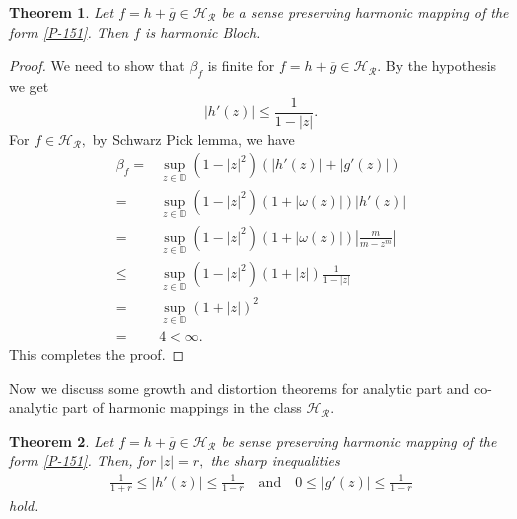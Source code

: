 \documentclass[a4paper,12pt]{amsart}
\newtheorem{thm}{Theorem}[section]
\theoremstyle{definition}
\begin{document}
	\begin{thm}
		Let $f=h+\overline{g}\in\mathcal{H_R}$ be a sense preserving harmonic mapping of the form \eqref{P-151}. Then $f$ is harmonic Bloch. 
	\end{thm}
	\begin{proof}
	We need to show that $\beta_f$ is finite for $f=h+\overline{g}\in\mathcal{H_R}$. By the hypothesis we get $$|h'(z)|\le\frac{1}{1-|z|}.$$ For $f\in\mathcal{H_R},$ by Schwarz Pick lemma, we have
	\begin{align*}
		\beta_f=& \sup_{z\in\mathbb{D}}(1-|z|^2)(|h'(z)|+|g'(z)|)\\
		= & \sup_{z\in\mathbb{D}}(1-|z|^2)(1+|\omega(z)|)|h'(z)|\\
		= & \sup_{z\in\mathbb{D}}(1-|z|^2)(1+|\omega(z)|)\left|\frac{m}{m-z^m}\right|\\
		\le & \sup_{z\in\mathbb{D}}(1-|z|^2)(1+|z|)\frac{1}{1-|z|}\\
		= & \sup_{z\in\mathbb{D}}(1+|z|)^2\\
		=& 4 <\infty.
	\end{align*}
	This completes the proof.
	\end{proof}
Now we discuss some growth and distortion theorems for analytic part and co-analytic part of harmonic mappings in the class $\mathcal{H_R}.$	
	\begin{thm}
	Let $f=h+\overline{g}\in\mathcal{H_R}$ be sense preserving harmonic mapping of the form \eqref{P-151}. Then, for $|z|=r,$ the sharp inequalities 
	\begin{align*}
	\frac{1}{1+r}\le|h'(z)|\le\frac{1}{1-r}\quad\text{and}\quad 0\le|g'(z)|\le\frac{1}{1-r}
	\end{align*}
	hold.
	\end{thm}
\end{document}
